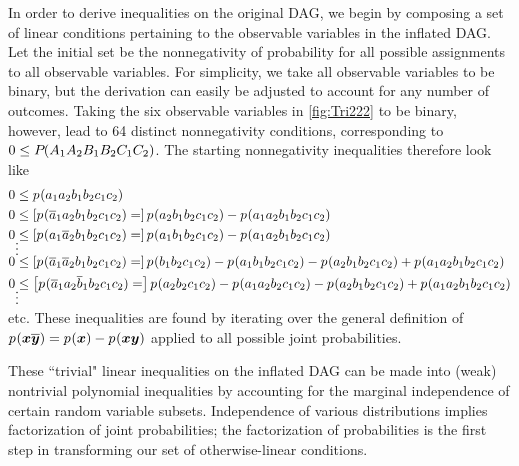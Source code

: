 {\label{step:generateineqs}\par\smallskip\nobreak


In order to derive inequalities on the original DAG, we begin by composing a set of linear conditions pertaining to the observable variables in the inflated DAG. Let the initial set be the nonnegativity of probability for all possible assignments to all observable variables. For simplicity, we take all observable variables to be binary, but the derivation can easily be adjusted to account for any number of outcomes. Taking the six observable variables in \cref{fig:Tri222} to be binary, however, lead to 64 distinct nonnegativity conditions, corresponding to $0\leq {P_{}}\lparen A_1 A_2 B_1 B_2 C_1 C_2\rparen$. The starting nonnegativity inequalities therefore look like
\begin{align}
\begin{split}
 0&\leq \p{a_1 a_2 b_1 b_2 c_1 c_2} \\
 0&\leq \left[\p{\n{a}_1 a_2 b_1 b_2 c_1 c_2}=\right]{\p{a_2 b_1 b_2 c_1 c_2} -\p{a_1 a_2 b_1 b_2 c_1 c_2}} \\
  0&\leq \left[\p{a_1 \n{a}_2 b_1 b_2 c_1 c_2}=\right]{\p{a_1 b_1 b_2 c_1 c_2} -\p{a_1 a_2 b_1 b_2 c_1 c_2}} \\
 \MTFlushSpaceAbove&{\vdots}\MTFlushSpaceBelow
 0&\leq \left[\p{\n{a}_1 \n{a}_2 b_1 b_2 c_1 c_2}=\right]{\p{b_1 b_2 c_1 c_2} -\p{a_1 b_1 b_2 c_1 c_2} -\p{a_2 b_1 b_2 c_1 c_2} + \p{a_1 a_2 b_1 b_2 c_1 c_2}}\\
  0&\leq \left[\p{\n{a}_1 a_2 \n{b}_1 b_2 c_1 c_2}=\right]{\p{a_2 b_2 c_1 c_2} -\p{a_1 a_2 b_2 c_1 c_2} -\p{a_2 b_1 b_2 c_1 c_2} + \p{a_1 a_2 b_1 b_2 c_1 c_2}}\\
 \MTFlushSpaceAbove
&{\vdots}
\MTFlushSpaceBelow
\end{split}
\end{align}
etc. These inequalities are found by iterating over the general definition of 
${p_{}}\lparen\bm{x} \overline{\bm{y}}\rparen={p_{}}\lparen\bm{x}\rparen-{p_{}}\lparen\bm{x} \bm{y}\rparen$
applied to all possible joint probabilities.

\label{step:fac}\par\smallskip\nobreak
These ``trivial" linear inequalities on the inflated DAG can be made into (weak) nontrivial polynomial inequalities by accounting for the marginal independence of certain random variable subsets. Independence of various distributions implies factorization of joint probabilities; the factorization of probabilities is the first step in transforming our set of otherwise-linear conditions.

}
